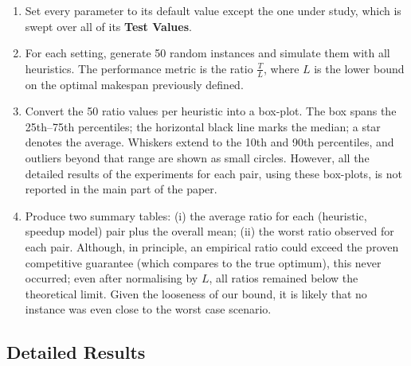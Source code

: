 \documentclass{article}
\begin{document}
\begin{enumerate}
    \item Set every parameter to its default value except the one under study,
          which is swept over all of its \textbf{Test Values}.
    \item For each setting, generate 50 random instances and simulate them with
          all heuristics.  
          The performance metric is the ratio \(\tfrac{T}{L}\), where \(L\) is the lower bound on the optimal makespan previously defined.
    \item Convert the 50 ratio values per heuristic into a box-plot.
          The box spans the 25th–75th percentiles; the horizontal black line
          marks the median; a star denotes the average.
          Whiskers extend to the 10th and 90th percentiles, and outliers
          beyond that range are shown as small circles. However, all the detailed results of the experiments for each pair, using these box-plots, is not reported in the main part of the paper.
    \item Produce two summary tables:  
          (i) the average ratio for each (heuristic, speedup model)
          pair plus the overall mean;  
          (ii) the worst ratio observed for each pair.
          Although, in principle, an empirical ratio could exceed the proven
          competitive guarantee (which compares to the true optimum), this
          never occurred; even after normalising by \(L\), all ratios remained
          below the theoretical limit. Given the looseness of our bound, it is likely that no instance was even close to the worst case scenario.
\end{enumerate}

\subsection{Detailed Results}
\end{document}
